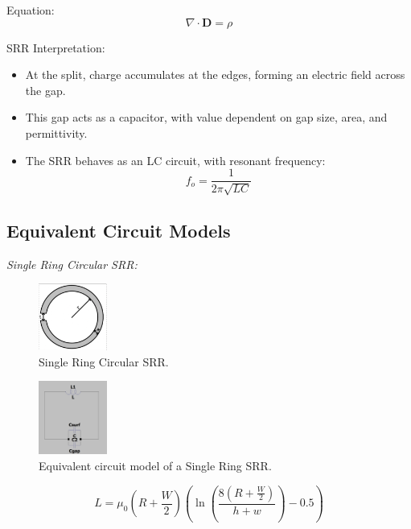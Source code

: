 \documentclass[conference]{IEEEtran}
\begin{document}
Equation:
\[
\nabla \cdot \mathbf{D} = \rho
\]


SRR Interpretation:
\begin{itemize}
    \item At the split, charge accumulates at the edges, forming an electric field across the gap.
    \item This gap acts as a capacitor, with value dependent on gap size, area, and permittivity.
    \item The SRR behaves as an LC circuit, with resonant frequency:
    \[
    f_o = \frac{1}{2\pi\sqrt{LC}}
    \]
\end{itemize}


\subsection{Equivalent Circuit Models}

\textit{Single Ring Circular SRR:} 
\begin{figure}[h]
\centering
    \includegraphics[width=0.2\textwidth]{Images/Single_Ring_SRR.png}
    \caption{Single Ring Circular SRR.}
\end{figure}

\begin{figure}[h]
\centering
    \includegraphics[width=0.2\textwidth]{Images/Single_Circular_Equivalent_model.png}
    \caption{Equivalent circuit model of a Single Ring SRR.}
\end{figure}

\begin{equation}
    L = \mu_0 \left( R + \frac{W}{2} \right) \left( \ln\left( \frac{8\left( R + \frac{W}{2} \right)}{h + w} \right) - 0.5 \right)
    \end{equation}
    
\end{document}
